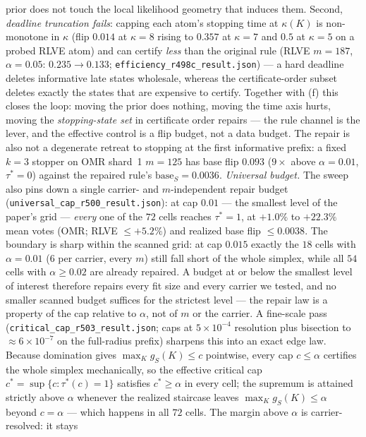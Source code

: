 \documentclass{article}
\theoremstyle{definition}
\theoremstyle{remark}
\begin{document}
prior does not touch the local likelihood geometry that induces them.
Second, \emph{deadline truncation fails}: capping each atom's stopping
time at $\kappa(K)$ is non-monotone in $\kappa$ (flip $0.014$ at
$\kappa{=}8$ rising to $0.357$ at $\kappa{=}7$ and $0.5$ at
$\kappa{=}5$ on a probed RLVE atom) and can certify \emph{less} than
the original rule (RLVE $m{=}187$, $\alpha{=}0.05$: $0.235\to0.133$;
\texttt{efficiency\_r498c\_result.json}) --- a hard deadline deletes
informative late states wholesale, whereas the certificate-order
subset deletes exactly the states that are expensive to certify.
Together with (f) this closes the loop: moving the prior does nothing,
moving the time axis hurts, moving the \emph{stopping-state set} in
certificate order repairs --- the rule channel is the lever, and the
effective control is a flip budget, not a data budget. The repair is
also not a degenerate retreat to stopping at the first informative
prefix: a fixed $k{=}3$ stopper on OMR shard~1 $m{=}125$ has base flip
$0.093$ ($9\times$ above $\alpha{=}0.01$, $\tau^*=0$) against the
repaired rule's $\mathrm{base}_S=0.0036$.
\emph{Universal budget.} The sweep also pins down a single
carrier- and $m$-independent repair budget
(\texttt{universal\_cap\_r500\_result.json}): at cap $0.01$ ---
the smallest level of the paper's grid --- \emph{every} one of the
$72$ cells reaches $\tau^*=1$, at $+1.0\%$ to $+22.3\%$ mean votes
(OMR; RLVE $\le+5.2\%$) and realized base flip $\le0.0038$. The
boundary is sharp within the scanned grid: at cap $0.015$ exactly
the $18$ cells with $\alpha{=}0.01$ ($6$ per carrier, every $m$)
still fall short of the whole simplex, while all $54$ cells with
$\alpha\ge0.02$ are already repaired. A budget at or below the
smallest level of interest therefore repairs every fit size and
every carrier we tested, and no smaller scanned budget suffices for
the strictest level --- the repair law is a property of the cap
relative to $\alpha$, not of $m$ or the carrier. A fine-scale pass
(\texttt{critical\_cap\_r503\_result.json}; caps at $5\times10^{-4}$
resolution plus bisection to ${\approx}6\times10^{-7}$ on the
full-radius prefix) sharpens this into an exact edge law. Because
domination gives $\max_K g_S(K)\le c$ pointwise, every cap
$c\le\alpha$ certifies the whole simplex mechanically, so the
effective critical cap $c^*=\sup\{c:\tau^*(c)=1\}$ satisfies
$c^*\ge\alpha$ in every cell; the supremum is attained strictly
above $\alpha$ whenever the realized staircase leaves
$\max_K g_S(K)\le\alpha$ beyond $c=\alpha$ --- which happens in all
$72$ cells. The margin above $\alpha$ is carrier-resolved: it stays
\end{document}
